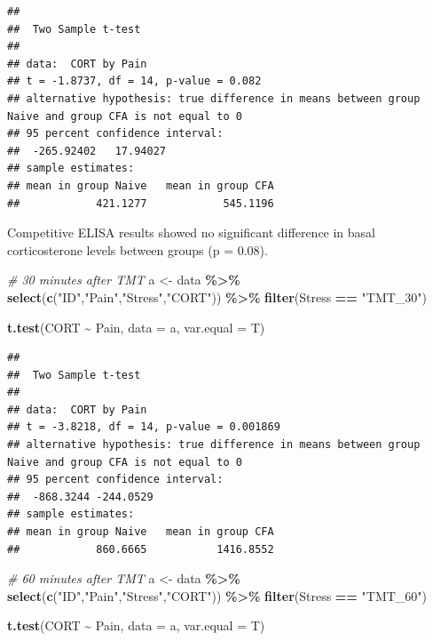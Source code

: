 \documentclass[
]{book}
\newenvironment{Shaded}{\begin{snugshade}}{\end{snugshade}}
\newcommand{\AttributeTok}[1]{\textcolor[rgb]{0.13,0.29,0.53}{#1}}
\newcommand{\CommentTok}[1]{\textcolor[rgb]{0.56,0.35,0.01}{\textit{#1}}}
\newcommand{\FunctionTok}[1]{\textcolor[rgb]{0.13,0.29,0.53}{\textbf{#1}}}
\newcommand{\NormalTok}[1]{#1}
\newcommand{\OtherTok}[1]{\textcolor[rgb]{0.56,0.35,0.01}{#1}}
\newcommand{\SpecialCharTok}[1]{\textcolor[rgb]{0.81,0.36,0.00}{\textbf{#1}}}
\newcommand{\StringTok}[1]{\textcolor[rgb]{0.31,0.60,0.02}{#1}}
\begin{document}
\begin{verbatim}
## 
##  Two Sample t-test
## 
## data:  CORT by Pain
## t = -1.8737, df = 14, p-value = 0.082
## alternative hypothesis: true difference in means between group Naive and group CFA is not equal to 0
## 95 percent confidence interval:
##  -265.92402   17.94027
## sample estimates:
## mean in group Naive   mean in group CFA 
##            421.1277            545.1196
\end{verbatim}

Competitive ELISA results showed no significant difference in basal corticosterone levels between groups (p = 0.08).

\begin{Shaded}
\begin{Highlighting}[]
\CommentTok{\# 30 minutes after TMT}
\NormalTok{a }\OtherTok{\textless{}{-}}\NormalTok{ data }\SpecialCharTok{\%\textgreater{}\%}
  \FunctionTok{select}\NormalTok{(}\FunctionTok{c}\NormalTok{(}\StringTok{"ID"}\NormalTok{,}\StringTok{"Pain"}\NormalTok{,}\StringTok{"Stress"}\NormalTok{,}\StringTok{"CORT"}\NormalTok{)) }\SpecialCharTok{\%\textgreater{}\%}
  \FunctionTok{filter}\NormalTok{(Stress }\SpecialCharTok{==} \StringTok{"TMT\_30"}\NormalTok{)}
  
\FunctionTok{t.test}\NormalTok{(CORT }\SpecialCharTok{\textasciitilde{}}\NormalTok{ Pain, }\AttributeTok{data =}\NormalTok{ a, }\AttributeTok{var.equal =}\NormalTok{ T)}
\end{Highlighting}
\end{Shaded}

\begin{verbatim}
## 
##  Two Sample t-test
## 
## data:  CORT by Pain
## t = -3.8218, df = 14, p-value = 0.001869
## alternative hypothesis: true difference in means between group Naive and group CFA is not equal to 0
## 95 percent confidence interval:
##  -868.3244 -244.0529
## sample estimates:
## mean in group Naive   mean in group CFA 
##            860.6665           1416.8552
\end{verbatim}

\begin{Shaded}
\begin{Highlighting}[]
\CommentTok{\# 60 minutes after TMT}
\NormalTok{a }\OtherTok{\textless{}{-}}\NormalTok{ data }\SpecialCharTok{\%\textgreater{}\%}
  \FunctionTok{select}\NormalTok{(}\FunctionTok{c}\NormalTok{(}\StringTok{"ID"}\NormalTok{,}\StringTok{"Pain"}\NormalTok{,}\StringTok{"Stress"}\NormalTok{,}\StringTok{"CORT"}\NormalTok{)) }\SpecialCharTok{\%\textgreater{}\%}
  \FunctionTok{filter}\NormalTok{(Stress }\SpecialCharTok{==} \StringTok{"TMT\_60"}\NormalTok{)}
  
\FunctionTok{t.test}\NormalTok{(CORT }\SpecialCharTok{\textasciitilde{}}\NormalTok{ Pain, }\AttributeTok{data =}\NormalTok{ a, }\AttributeTok{var.equal =}\NormalTok{ T)}
\end{Highlighting}
\end{Shaded}
\end{document}
